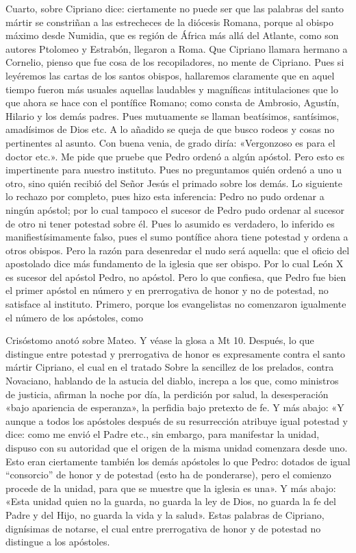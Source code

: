 Cuarto, sobre Cipriano dice: ciertamente no puede ser que las palabras del santo mártir se constriñan a las estrecheces de la diócesis Romana, porque al obispo máximo desde Numidia, que es región de África más allá del Atlante, como son autores Ptolomeo y Estrabón, llegaron a Roma. Que Cipriano llamara hermano a Cornelio, pienso que fue cosa de los recopiladores, no mente de Cipriano. Pues si leyéremos las cartas de los santos obispos, hallaremos claramente que en aquel tiempo fueron más usuales aquellas laudables y magníficas intitulaciones que lo que ahora se hace con el pontífice Romano; como consta de Ambrosio, Agustín, Hilario y los demás padres. Pues mutuamente se llaman beatísimos, santísimos, amadísimos de Dios etc. A lo añadido se queja de que busco rodeos y cosas no pertinentes al asunto. Con buena venia, de grado diría: «Vergonzoso es para el doctor etc.». Me pide que pruebe que Pedro ordenó a algún apóstol. Pero esto es impertinente para nuestro instituto. Pues no preguntamos quién ordenó a uno u otro, sino quién recibió del Señor Jesús el primado sobre los demás. Lo siguiente lo rechazo por completo, pues hizo esta inferencia: Pedro no pudo ordenar a ningún apóstol; por lo cual tampoco el sucesor de Pedro pudo ordenar al sucesor de otro ni tener potestad sobre él. Pues lo asumido es verdadero, lo inferido es manifiestísimamente falso, pues el sumo pontífice ahora tiene potestad y ordena a otros obispos. Pero la razón para desenredar el nudo será aquella: que el oficio del apostolado dice más fundamento de la iglesia que ser obispo. Por lo cual León X es sucesor del apóstol Pedro, no apóstol. Pero lo que confiesa, que Pedro fue bien el primer apóstol en número y en prerrogativa de honor y no de potestad, no satisface al instituto. Primero, porque los evangelistas no comenzaron igualmente el número de los apóstoles, como

Crisóstomo anotó sobre Mateo. Y véase la glosa a Mt 10. Después, lo que distingue entre potestad y prerrogativa de honor \marginpar{\small[269]} es expresamente contra el santo mártir Cipriano, el cual en el tratado Sobre la sencillez de los prelados, contra Novaciano, hablando de la astucia del diablo, increpa a los que, como ministros de justicia, afirman la noche por día, la perdición por salud, la desesperación «bajo apariencia de esperanza», la perfidia bajo pretexto de fe. Y más abajo: «Y aunque a todos los apóstoles después de su resurrección atribuye igual potestad y dice: como me envió el Padre etc., sin embargo, para manifestar la unidad, dispuso con su autoridad que el origen de la misma unidad comenzara desde uno. Esto eran ciertamente también los demás apóstoles lo que Pedro: dotados de igual “consorcio” de honor y de potestad (esto ha de ponderarse), pero el comienzo procede de la unidad, para que se muestre que la iglesia es una». Y más abajo: «Esta unidad quien no la guarda, no guarda la ley de Dios, no guarda la fe del Padre y del Hijo, no guarda la vida y la salud». Estas palabras de Cipriano, dignísimas de notarse, el cual entre prerrogativa de honor y de potestad no distingue a los apóstoles.

